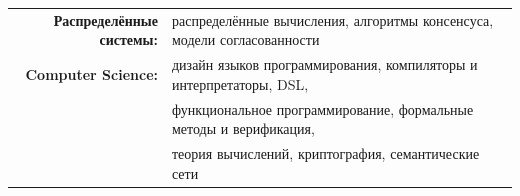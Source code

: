 
\vspace{1em}
\begin{tabular}{rl}

    \textbf{Распределённые системы:} & распределённые вычисления, алгоритмы консенсуса, модели согласованности \\
    \textbf{Computer Science:} & дизайн языков программирования, компиляторы и интерпретаторы, DSL, \\
                               & функциональное программирование, формальные методы и верификация, \\
                               & теория вычислений, криптография, семантические сети \\

\end{tabular}
